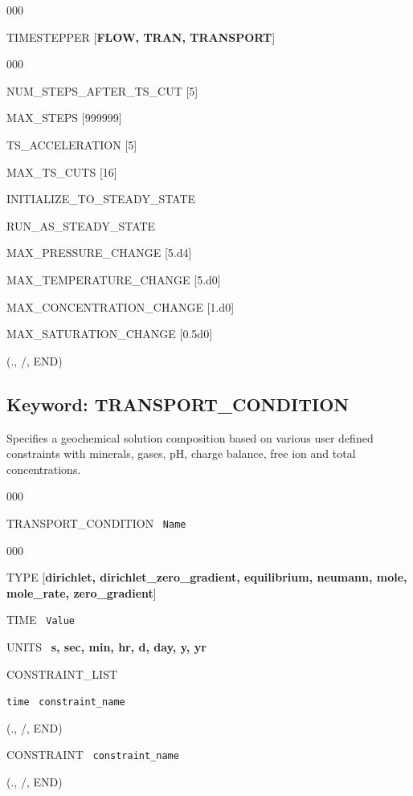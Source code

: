 \documentclass[12pt]{article}
\begin{document}
\begin{deflist}{000}
\item[TIMESTEPPER] [{\bf FLOW, TRAN, TRANSPORT}]
\begin{deflist}{000}
\item[NUM\_STEPS\_AFTER\_TS\_CUT] [5]
\item[MAX\_STEPS] [999999]
\item[TS\_ACCELERATION] [5]
\item[MAX\_TS\_CUTS] [16]
\item[INITIALIZE\_TO\_STEADY\_STATE]
\item[RUN\_AS\_STEADY\_STATE]
\item[MAX\_PRESSURE\_CHANGE] [5.d4]
\item[MAX\_TEMPERATURE\_CHANGE] [5.d0]
\item[MAX\_CONCENTRATION\_CHANGE] [1.d0]
\item[MAX\_SATURATION\_CHANGE] [0.5d0]
\end{deflist}
\item[(., /, END)]
\end{deflist}




\newpage
\protect\hypertarget{target_trans_cond}{}

\subsection{Keyword: TRANSPORT\_CONDITION}

 Specifies a geochemical solution composition based on various user defined constraints with minerals, gases, pH, charge balance, free ion and total concentrations.

\begin{deflist}{000}
\item[TRANSPORT\_CONDITION] \ {\tt Name}

\begin{deflist}{000}
\item[TYPE] [{\bf dirichlet, dirichlet\_zero\_gradient, equilibrium, neumann, mole, mole\_rate, \linebreak zero\_gradient}]
\item[TIME] \ {\tt Value}
\item[UNITS] \ {\bf s, sec, min, hr, d, day, y, yr}
\item[CONSTRAINT\_LIST]
\item {\tt time} \ {\tt constraint\_name}
\item[(., /, END)]
\item[CONSTRAINT] \ {\tt constraint\_name}
\end{deflist}
\item[(., /, END)]
\end{deflist}
\end{document}
